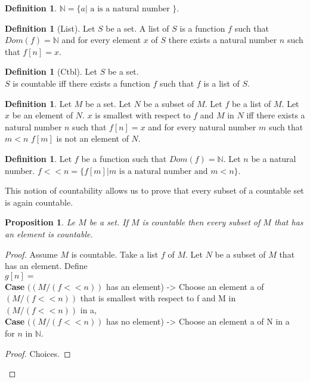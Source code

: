 \documentclass[10pt]{article}
\newenvironment{forthel}{\begin{leftbar}}{\end{leftbar}}
\newcommand{\N}{\mathbb{N}}
\theoremstyle{definition}
\newtheorem{definition}[theorem]{Definition}
\theoremstyle{plain}
\newtheorem{proposition}[theorem]{Proposition}
\theoremstyle{remark}
\begin{document}
\begin{forthel}
	\begin{definition}
		$\N = \{ a | \text{ a is a natural number }\}$.
	\end{definition}
	\begin{definition}[List]
		Let $S$ be a set. A list of $S$ is a function $f$ such that $Dom(f) = \N$ and for every element $x$ of $S$ there exists a natural number $n$ such that $f[n] = x$.
	\end{definition}
	\begin{definition}[Ctbl]
		Let $S$ be a set. \\
		$S$ is countable iff there exists a function $f$ such that $f$ is a list of $S$.
	\end{definition}
	\begin{definition}
		Let $M$ be a set. Let $N$ be a subset of $M$. Let $f$ be a list of $M$. Let $x$ be an element of $N$. $x$ is smallest with respect to $f$ and $M$ in $N$ iff there exists a natural number $n$ such that $f[n]=x$ and for every natural number $m$ such that $m < n$ $f[m]$ is not an element of $N$.
	\end{definition}
	\begin{definition}
		Let $f$ be a function such that $Dom(f)= \N$. Let $n$ be a natural number. $f << n = \{f[m]| m\text{ is a natural number and } m<n \}$.
	\end{definition}
\end{forthel}
This notion of countability allows us to prove that every subset of a countable set is again countable.
\begin{forthel}
	\begin{proposition}
	Le $M$ be a set. If $M$ is countable then every subset of $M$ that has an element is countable.
	\end{proposition}
	\begin{proof}
		Assume $M$ is countable. Take a list $f$ of $M$. Let $N$ be a subset of $M$ that has an element. Define \\
		$g[n] = $ \\
		\hspace*{1em}\textbf{Case} $((M/(f << n))$ has an element) -> Choose an element a of $(M/(f << n))$ that is smallest with respect to f and M in $(M/(f << n))$ in a, \\
		\hspace*{1em}\textbf{Case} $((M/(f<<n))$ has no element) -> Choose an element a of N in a \\
		for $n$ in $\N$.
		\begin{proof}
			Choices.
		\end{proof}
	\end{proof}
\end{forthel}
\end{document}
